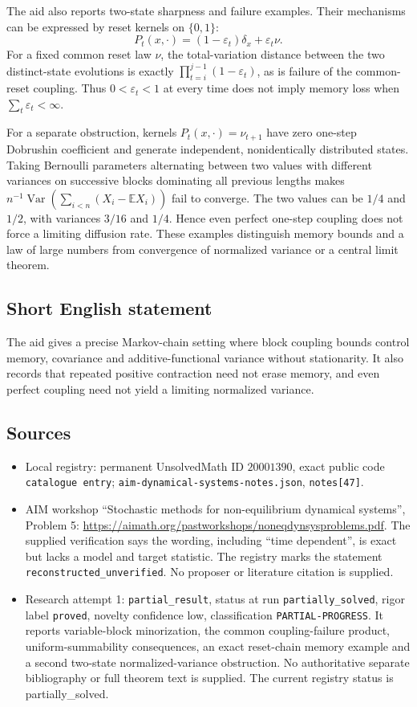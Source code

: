 \documentclass[11pt]{article}
\newcommand{\E}{\mathbb{E}}
\begin{document}
The aid also reports two-state sharpness and failure examples. Their mechanisms can be expressed by reset kernels on \(\{0,1\}\):
\[
 P_t(x,\cdot)=(1-\varepsilon_t)\delta_x+\varepsilon_t\nu.
\]
For a fixed common reset law \(\nu\), the total-variation distance between the two distinct-state evolutions is exactly \(\prod_{t=i}^{j-1}(1-\varepsilon_t)\), as is failure of the common-reset coupling. Thus \(0<\varepsilon_t<1\) at every time does not imply memory loss when \(\sum_t\varepsilon_t<\infty\).

For a separate obstruction, kernels \(P_t(x,\cdot)=\nu_{t+1}\) have zero one-step Dobrushin coefficient and generate independent, nonidentically distributed states. Taking Bernoulli parameters alternating between two values with different variances on successive blocks dominating all previous lengths makes
\(n^{-1}\operatorname{Var}(\sum_{i<n}(X_i-\E X_i))\)
fail to converge. The two values can be \(1/4\) and \(1/2\), with variances \(3/16\) and \(1/4\). Hence even perfect one-step coupling does not force a limiting diffusion rate. These examples distinguish memory bounds and a law of large numbers from convergence of normalized variance or a central limit theorem.
\subsection{Short English statement}
The aid gives a precise Markov-chain setting where block coupling bounds control memory, covariance and additive-functional variance without stationarity. It also records that repeated positive contraction need not erase memory, and even perfect coupling need not yield a limiting normalized variance.
\subsection{Sources}
\begin{itemize}
\item Local registry: permanent UnsolvedMath ID \(20001390\), exact public code \texttt{catalogue entry}; \texttt{aim-dynamical-systems-notes.json}, \texttt{notes[47]}.
\item AIM workshop ``Stochastic methods for non-equilibrium dynamical systems'', Problem 5: \url{https://aimath.org/pastworkshops/noneqdynsysproblems.pdf}. The supplied verification says the wording, including ``time dependent'', is exact but lacks a model and target statistic. The registry marks the statement \texttt{reconstructed\_unverified}. No proposer or literature citation is supplied.
\item Research attempt 1: \texttt{partial\_result}, status at run \texttt{partially\_solved}, rigor label \texttt{proved}, novelty confidence low, classification \texttt{PARTIAL-PROGRESS}. It reports variable-block minorization, the common coupling-failure product, uniform-summability consequences, an exact reset-chain memory example and a second two-state normalized-variance obstruction. No authoritative separate bibliography or full theorem text is supplied. The current registry status is partially_solved.
\end{itemize}
\end{document}
